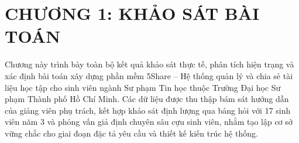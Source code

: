 \section{CHƯƠNG 1: KHẢO SÁT BÀI TOÁN}

\noindent Chương này trình bày toàn bộ kết quả khảo sát thực tế, phân tích hiện trạng và xác định bài toán xây dựng phần mềm 5Share -- Hệ thống quản lý và chia sẻ tài liệu học tập cho sinh viên ngành Sư phạm Tin học thuộc Trường Đại học Sư phạm Thành phố Hồ Chí Minh. Các dữ liệu được thu thập bám sát hướng dẫn của giảng viên phụ trách, kết hợp khảo sát định lượng qua bảng hỏi với 17 sinh viên năm 3 và phỏng vấn giả định chuyên sâu cựu sinh viên, nhằm tạo lập cơ sở vững chắc cho giai đoạn đặc tả yêu cầu và thiết kế kiến trúc hệ thống.

\vspace{0.3cm}

\newpage

\newpage

\newpage

\newpage

